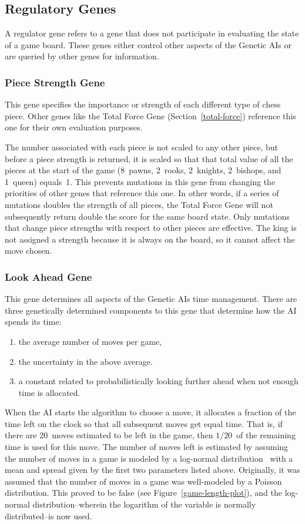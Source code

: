 \documentclass[letterpaper]{article}
\renewcommand{\_}{\allowbreak\textunderscore\allowbreak}
\begin{document}
\subsection{Regulatory Genes}
A regulator gene refers to a gene that does not participate in evaluating the state of a game board. These genes either control other aspects of the Genetic AIs or are queried by other genes for information.

\subsubsection{Piece Strength Gene}
This gene specifies the importance or strength of each different type of chess piece. Other genes like the Total Force Gene (Section~\ref{total-force}) reference this one for their own evaluation purposes.

The number associated with each piece is not scaled to any other piece, but before a piece strength is returned, it is scaled so that that total value of all the pieces at the start of the game (8~pawns, 2~rooks, 2~knights, 2~bishops, and 1~queen) equals~1. This prevents mutations in this gene from changing the priorities of other genes that reference this one. In other words, if a series of mutations doubles the strength of all pieces, the Total Force Gene will not subsequently return double the score for the same board state. Only mutations that change piece strengths with respect to other pieces are effective. The king is not assigned a strength because it is always on the board, so it cannot affect the move chosen.

\subsubsection{Look Ahead Gene}
This gene determines all aspects of the Genetic AIs time management. There are three genetically determined components to this gene that determine how the AI spends its time:
\begin{enumerate}
	\item the average number of moves per game,
	\item the uncertainty in the above average.
	\item a constant related to probabilistically looking further ahead when not enough time is allocated.
\end{enumerate}
When the AI starts the algorithm to choose a move, it allocates a fraction of the time left on the clock so that all subsequent moves get equal time. That is, if there are 20~moves estimated to be left in the game, then \(1/20\)~of the remaining time is used for this move. The number of moves left is estimated by assuming the number of moves in a game is modeled by a log-normal distribution~\cite{log-norm-wiki}\cite{log-norm-chess-se} with a mean and spread given by the first two parameters listed above. Originally, it was assumed that the number of moves in a game was well-modeled by a Poisson distribution. This proved to be false (see Figure~\ref{game-length-plot}), and the log-normal distribution--wherein the logarithm of the variable is normally distributed--is now used.
\end{document}

